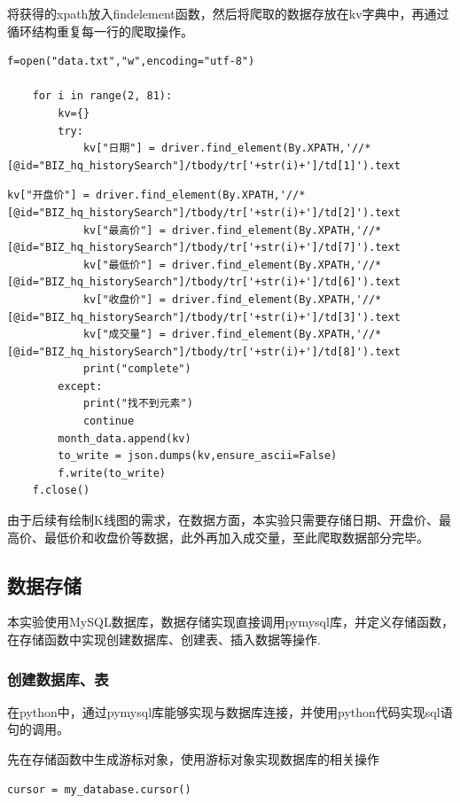 \documentclass[UTF8,12pt]{article}
\begin{document}
将获得的xpath放入findelement函数，然后将爬取的数据存放在kv字典中，再通过循环结构重复每一行的爬取操作。

\begin{lstlisting}[frame=shadowbox]
    f=open("data.txt","w",encoding="utf-8")

    for i in range(2, 81):
        kv={}
        try:
            kv["日期"] = driver.find_element(By.XPATH,'//*[@id="BIZ_hq_historySearch"]/tbody/tr['+str(i)+']/td[1]').text
\end{lstlisting}
    
\begin{lstlisting}[title=findelement数据爬取,frame=shadowbox]
            kv["开盘价"] = driver.find_element(By.XPATH,'//*[@id="BIZ_hq_historySearch"]/tbody/tr['+str(i)+']/td[2]').text
            kv["最高价"] = driver.find_element(By.XPATH,'//*[@id="BIZ_hq_historySearch"]/tbody/tr['+str(i)+']/td[7]').text
            kv["最低价"] = driver.find_element(By.XPATH,'//*[@id="BIZ_hq_historySearch"]/tbody/tr['+str(i)+']/td[6]').text
            kv["收盘价"] = driver.find_element(By.XPATH,'//*[@id="BIZ_hq_historySearch"]/tbody/tr['+str(i)+']/td[3]').text
            kv["成交量"] = driver.find_element(By.XPATH,'//*[@id="BIZ_hq_historySearch"]/tbody/tr['+str(i)+']/td[8]').text
            print("complete")
        except:
            print("找不到元素")
            continue
        month_data.append(kv)
        to_write = json.dumps(kv,ensure_ascii=False)
        f.write(to_write)
    f.close()
\end{lstlisting}

由于后续有绘制K线图的需求，在数据方面，本实验只需要存储日期、开盘价、最高价、最低价和收盘价等数据，此外再加入成交量，至此爬取数据部分完毕。

\subsection{数据存储}
本实验使用MySQL数据库，数据存储实现直接调用pymysql库，并定义存储函数，在存储函数中实现创建数据库、创建表、插入数据等操作.

\subsubsection{创建数据库、表}
在python中，通过pymysql库能够实现与数据库连接，并使用python代码实现sql语句的调用。

先在存储函数中生成游标对象，使用游标对象实现数据库的相关操作

\begin{lstlisting}[title=生成游标对象,frame=shadowbox]
    cursor = my_database.cursor()
\end{lstlisting}
\end{document}
